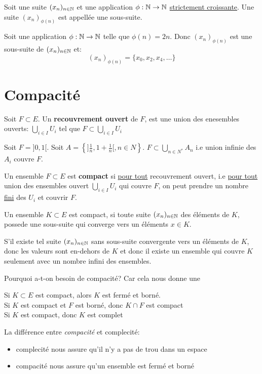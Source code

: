 \begin{definition}
    Soit une suite $(x_n)_{n \in \mathbb{N}}$ et une application  $\phi:\mathbb{N} \to \mathbb{N}$ \underline{strictement croissante}. Une suite $(x_n)_{\phi(n)}$ est appellée une sous-suite.
\end{definition}
\begin{eg}
    Soit une application $\phi: \mathbb{N} \to \mathbb{N}$ telle que $\phi(n) = 2n$. Donc  $(x_n)_{\phi(n)}$ est une sous-suite de  $(x_n)_{n \in \mathbb{N}}$ et:
    \[
        (x_n)_{\phi(n)} = \{x_0, x_2, x_4, \ldots\}
    \] 
\end{eg}

\section{Compacité}
\begin{definition}
    Soit $F \subset E$. Un \textbf{recouvrement ouvert} de $F$, est une union des enesembles ouverts:  $\bigcup_{i \in I} U_i$ tel que $F \subset \bigcup_{i \in I} U_i$
\end{definition}
\begin{eg}
    Soit $F = ]0, 1[$. Soit $A = \left\{]\frac{1}{n}, 1 + \frac{1}{n}[, n \in N\right\}$. $F \subset \bigcup_{n \in N^{*}} A_n$ i.e union infinie des $A_i$ couvre $F$.
\end{eg}
\begin{definition}
    Un ensemble $F \subset E$ est \textbf{compact} si \underline{pour tout} recouvrement ouvert, i.e \underline{pour tout} union des ensembles ouvert $\bigcup_{i \in I} U_i$ qui couvre $F$, on peut prendre un nombre \underline{fini} des  $U_i$ et couvrir $F$.
\end{definition}
\begin{theorem}
    Un ensemble $K \subset E$ est compact, si toute suite $(x_n)_{n \in \mathbb{N}}$ des éléments de $K$, possede une sous-suite qui converge  vers un éléments $x \in K$.
\end{theorem}
\begin{intuition}
    S'il existe tel suite $(x_n)_{n \in \mathbb{N}}$ sans sous-suite convergente vers un éléments de  $K$, donc les valeurs sont en-dehors de  $K$ et donc il existe un ensemble qui couvre $K$  seulement avec un nombre infini des ensembles. 
\end{intuition}
Pourquoi a-t-on besoin de compacité? Car cela nous donne une
\begin{prop}
    Si $K \subset E$ est compact, alors $K$ est fermé et borné.\\
    Si $K$ est compact et  $F$ est borné, donc  $K \cap F$ est compact\\
    Si $K$ est compact, donc  $K$ est complet
\end{prop}
\begin{property}
    La différence entre \textit{compacité} et {complecité}:
    \begin{itemize}
        \item complecité nous assure qu'il n'y a pas de trou dans un espace
        \item compacité nous assure qu'un ensemble est fermé et borné
    \end{itemize}
\end{property}
